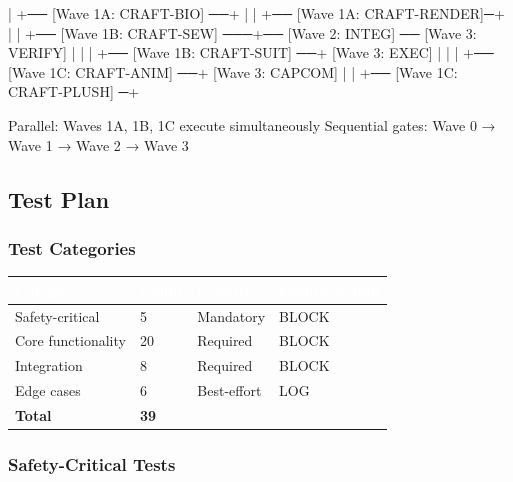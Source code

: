 \documentclass[11pt,letterpaper]{article}
\newcommand{\tableheader}[1]{\textbf{\sffamily\textcolor{white}{#1}}}
\begin{document}
\begin{asciibox}
    |
    +── [Wave 1A: CRAFT-BIO] ──+
    |                           |
    +── [Wave 1A: CRAFT-RENDER]─+
    |                           |
    +── [Wave 1B: CRAFT-SEW] ───+── [Wave 2: INTEG] ── [Wave 3: VERIFY]
    |                           |                              |
    +── [Wave 1B: CRAFT-SUIT] ──+                     [Wave 3: EXEC]
    |                           |                              |
    +── [Wave 1C: CRAFT-ANIM] ──+                     [Wave 3: CAPCOM]
    |                           |
    +── [Wave 1C: CRAFT-PLUSH] ─+

Parallel: Waves 1A, 1B, 1C execute simultaneously
Sequential gates: Wave 0 → Wave 1 → Wave 2 → Wave 3
\end{asciibox}

\subsection{Test Plan}

\subsubsection{Test Categories}

\begin{center}
\begin{tabularx}{\textwidth}{L{3.5cm}C{1.5cm}L{2cm}C{2cm}}
\toprule
{}
\tableheader{Category} & \tableheader{Count} & \tableheader{Priority} & \tableheader{Failure Action} \\
\midrule
Safety-critical & 5 & Mandatory & BLOCK \\
Core functionality & 20 & Required & BLOCK \\
Integration & 8 & Required & BLOCK \\
Edge cases & 6 & Best-effort & LOG \\
\midrule
\textbf{Total} & \textbf{39} & & \\
\bottomrule
\end{tabularx}
\end{center}

\subsubsection{Safety-Critical Tests}
\end{document}
